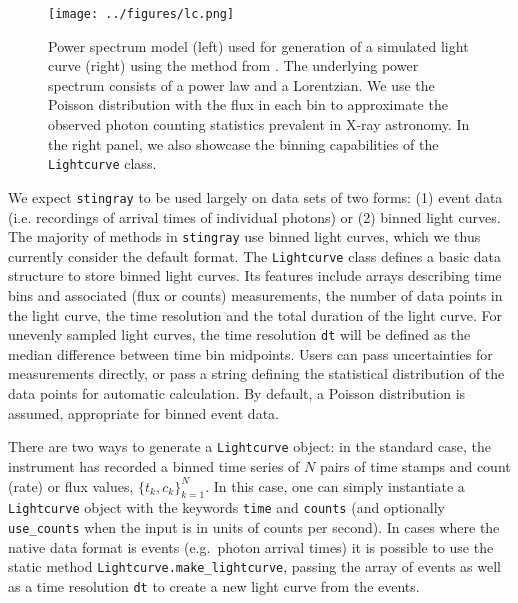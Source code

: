 \documentclass[12pt]{emulateapj}
\newcommand{\stingray}{\texttt{stingray}\xspace}
\newcommand{\lightcurve}{\texttt{Lightcurve}\xspace}
\begin{document}
\begin{figure*}
\begin{center}
\texttt{[image: ../figures/lc.png]}
\caption{Power spectrum model (left) used for generation of a simulated light curve (right) using the method from \citet{timmer1995}. The underlying power spectrum consists of a power law and a Lorentzian. We use the Poisson distribution with the flux in each bin to approximate the observed photon counting statistics prevalent in X-ray astronomy. In the right panel, we also showcase the binning capabilities of the \texttt{Lightcurve} class.}
\label{fig:scores}
\end{center}
\end{figure*}


We expect \stingray to be used largely on data sets of two forms: (1) event data (i.e. recordings of arrival times of individual photons) or (2) binned light curves. 
The majority of methods in \stingray use binned light curves, which we thus currently consider the default format. The \lightcurve class defines a basic data structure to store binned light curves. Its features include arrays describing time bins and associated (flux or counts) measurements, the number of data points in the light curve, the time resolution and the total duration of the light curve. For unevenly sampled light curves, the time resolution \texttt{dt} will be defined as the median difference between time bin midpoints. Users can pass uncertainties for measurements directly, or pass a string defining the statistical distribution of the data points for automatic calculation. By default, a Poisson distribution is assumed, appropriate for binned event data. 

There are two ways to generate a \texttt{Lightcurve} object: in the standard case, the instrument has recorded a binned time series of $N$ pairs of time stamps and count (rate) or flux values, $\{t_k, c_k \}_{k=1}^{N}$. In this case, one can simply instantiate a \texttt{Lightcurve} object with the keywords \texttt{time} and \texttt{counts} (and optionally \texttt{use\_counts} when the input is in units of counts per second). In cases where the native data format is events (e.g.\ photon arrival times) it is possible to use the static method \texttt{Lightcurve.make\_lightcurve}, passing the array of events as well as a time resolution \texttt{dt} to create a new light curve from the events.
\end{document}
